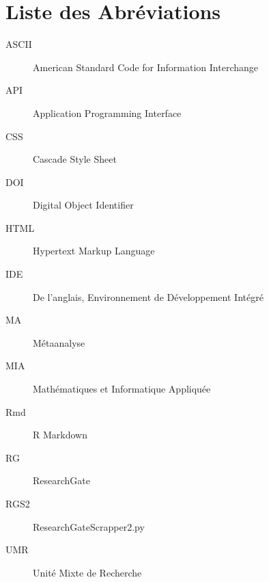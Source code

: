 \documentclass{book}
\begin{document}
\newpage
\mbox{} %


\newpage
\listoffigures %
\thispagestyle{fancy}


\newpage
\mbox{} %


\newpage
{}
\chapter*{Liste des Abréviations}

\begin{description}
    \item[ASCII] American Standard Code for Information Interchange
    \item[API] Application Programming Interface
    \item[CSS] Cascade Style Sheet
    \item[DOI] Digital Object Identifier
    \item[HTML] Hypertext Markup Language
    \item[IDE] De l'anglais, Environnement de Développement Intégré
    \item[MA] Métaanalyse
    \item[MIA] Mathématiques et Informatique Appliquée
    \item[Rmd] R Markdown
    \item[RG] ResearchGate
    \item[RGS2] ResearchGateScrapper2.py
    \item[UMR] Unité Mixte de Recherche

\end{description}
\thispagestyle{fancy}
\end{document}
